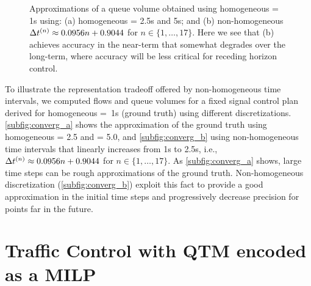 



\begin{figure*}[t!]
\centering
{}
\label{fig:conv}
%
\caption{Approximations of a queue volume obtained using homogeneous
\DT[] = 1s using: (a) homogeneous \DT[] = 2.5s and 5s; and (b) non-homogeneous
$\DT[n] \approx 0.0956n + 0.9044$ for $n \in \{1,\dots,17\}$.  Here we see
that (b) achieves accuracy in the near-term that somewhat degrades over
the long-term, where accuracy will be less critical for receding horizon control.}
%
\end{figure*}


To illustrate the representation tradeoff offered by non-homogeneous time
intervals, we computed flows and queue volumes for a fixed signal control plan
derived for homogeneous \mbox{\DT[n] = 1s} (ground truth) using different
discretizations.
%
\cref{subfig:converg_a} shows the approximation of the ground truth using
homogeneous \DT[] = 2.5 and \DT[] = 5.0, and \cref{subfig:converg_b} using
non-homogeneous time intervals that linearly increases from 1s to 2.5s, i.e.,
$\DT[n] \approx 0.0956n + 0.9044$ for $n \in \{1,\dots,17\}$.
%
As \cref{subfig:converg_a} shows, large time steps can be rough approximations
of the ground truth.
%
Non-homogeneous discretization (\cref{subfig:converg_b}) exploit this fact to
provide a good approximation in the initial time steps and progressively
decrease precision for points far in the future.






\section{Traffic Control with QTM encoded as a MILP}

